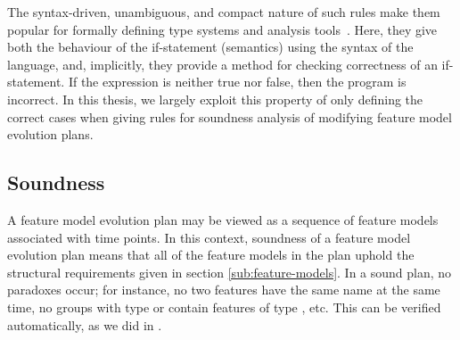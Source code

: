 The syntax-driven, unambiguous, and compact nature of such rules make them popular for formally defining type systems and analysis tools~\cite{book:principles-of-program-analysis}. Here, they give both the behaviour of the if-statement (semantics) using the syntax of the language, and, implicitly, they provide a method for checking correctness of an if-statement. If the expression is neither true nor false, then the program is incorrect. In this thesis, we largely exploit this property of only defining the correct cases when giving rules for soundness analysis of modifying feature model evolution plans.



\subsection{Soundness}
A feature model evolution plan may be viewed as a sequence of feature models associated with time points. 
In this context, soundness of a feature model evolution plan means that all of the feature models in the plan uphold the structural requirements  given in section \vref{sub:feature-models}. In a sound plan, no paradoxes occur; for instance, no two features have the same name at the same time, no groups with type \xortype{} or \andtype{} contain features of type \mandatory{}, etc. This can be verified automatically, as we did in \cite{art:consistency-preserving-evolution-planning}.
